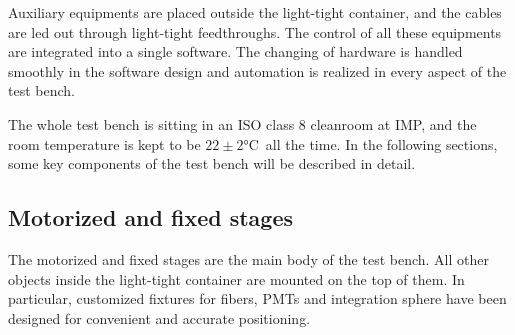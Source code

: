\documentclass{JINST}
\begin{document}
Auxiliary equipments are placed outside the light-tight container, and the cables are led out through light-tight feedthroughs.
The control of all these equipments are integrated into a single software. The changing of hardware is handled smoothly in the software design and automation is realized in every aspect of the test bench.
	
The whole test bench is sitting in an ISO class 8 cleanroom at IMP, and the room temperature is kept to be $22\pm2$\si{\celsius}~all the time. 
In the following sections, some key components of the test bench will be described in detail.
	
\subsection{Motorized and fixed stages}
\label{sec:stages}
	
The motorized and fixed stages are the main body of the test bench.
All other objects inside the light-tight container are mounted on the top of them.
In particular, customized fixtures for fibers, PMTs and integration sphere have been designed for convenient and accurate positioning.

\end{document}
